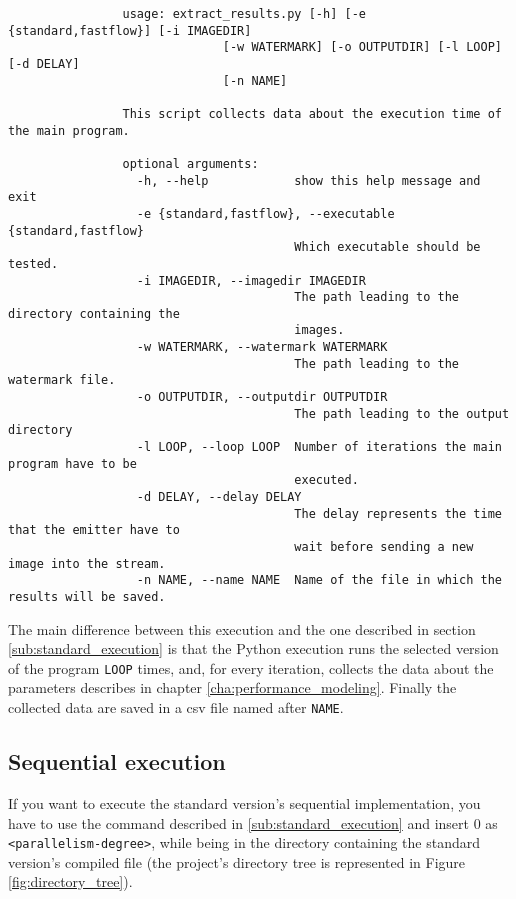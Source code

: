             \begin{verbatim}
                usage: extract_results.py [-h] [-e {standard,fastflow}] [-i IMAGEDIR]
                              [-w WATERMARK] [-o OUTPUTDIR] [-l LOOP] [-d DELAY]
                              [-n NAME]

                This script collects data about the execution time of the main program.

                optional arguments:
                  -h, --help            show this help message and exit
                  -e {standard,fastflow}, --executable {standard,fastflow}
                                        Which executable should be tested.
                  -i IMAGEDIR, --imagedir IMAGEDIR
                                        The path leading to the directory containing the
                                        images.
                  -w WATERMARK, --watermark WATERMARK
                                        The path leading to the watermark file.
                  -o OUTPUTDIR, --outputdir OUTPUTDIR
                                        The path leading to the output directory
                  -l LOOP, --loop LOOP  Number of iterations the main program have to be
                                        executed.
                  -d DELAY, --delay DELAY
                                        The delay represents the time that the emitter have to
                                        wait before sending a new image into the stream.
                  -n NAME, --name NAME  Name of the file in which the results will be saved.
            \end{verbatim}

            The main difference between this execution and the one described in section
            \ref{sub:standard_execution} is that the Python execution runs the selected version of the program
            \texttt{LOOP} times, and, for every iteration, collects the data about the parameters describes in
            chapter \ref{cha:performance_modeling}. Finally the collected data are saved in a csv file named
            after \texttt{NAME}.
        \subsection{Sequential execution} %
        \label{sub:sequential_execution}
            If you want to execute the standard version's sequential implementation, you have to use the
            command described in \ref{sub:standard_execution} and insert $0$ as
            \texttt{<parallelism-degree>}, while being in the directory containing the standard version's
            compiled file (the project's directory tree is represented in Figure \ref{fig:directory_tree}).
